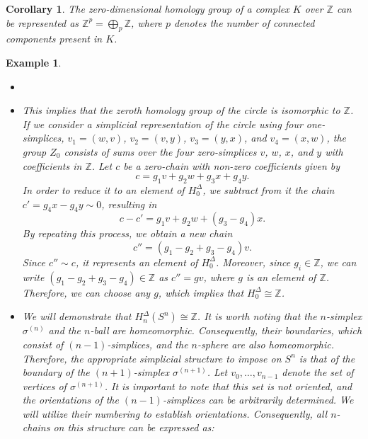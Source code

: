 \documentclass{amsart}
\newtheorem{corollary}[definition]{Corollary}
\newtheorem{example}[definition]{Example}
\begin{document}
\begin{corollary}
\label{directsum0hom}
The zero-dimensional homology group of a complex $K$ over $\mathbb{Z}$ can be represented as $\mathbb{Z}^p = \bigoplus_p \mathbb{Z}$, where $p$ denotes the number of connected components present in $K$.
\end{corollary}

\begin{example}
\begin{itemize}
	\item[]
	\item This implies that the zeroth homology group of the circle is isomorphic to $\mathbb{Z}$. If we consider a simplicial representation of the circle using four one-simplices, $v_1 = (w,v)$, $v_2 = (v,y)$, $v_3 = (y,x)$, and $v_4 = (x,w)$, the group $Z_0$ consists of sums over the four zero-simplices $v$, $w$, $x$, and $y$ with coefficients in $\mathbb{Z}$. Let $c$ be a zero-chain with non-zero coefficients given by
	\begin{equation}
	c = g_1v+g_2w+g_3x+g_4y.
	\end{equation}
	In order to reduce it to an element of $H^\Delta_0$, we subtract from it the chain $c' = g_4x-g_4y \sim 0$, resulting in
	\begin{equation}
	c-c' = g_1v+g_2w +(g_3-g_4)x.
	\end{equation}
	By repeating this process, we obtain a new chain
	\begin{equation}
	c'' = (g_1-g_2+g_3-g_4)v.
	\end{equation}
	Since $c'' \sim c$, it represents an element of $H^\Delta_0$. Moreover, since $g_i \in \mathbb{Z}$, we can write $(g_1-g_2+g_3-g_4) \in \mathbb{Z}$ as $c'' = gv$, where $g$ is an element of $\mathbb{Z}$. Therefore, we can choose any $g$, which implies that $H^\Delta_0 \cong \mathbb{Z}$.
	\item We will demonstrate that $H^\Delta_n(S^n) \cong \mathbb{Z}$. It is worth noting that the $n$-simplex $\sigma^{(n)}$ and the $n$-ball are homeomorphic. Consequently, their boundaries, which consist of $(n-1)$-simplices, and the $n$-sphere are also homeomorphic. Therefore, the appropriate simplicial structure to impose on $S^n$ is that of the boundary of the $(n+1)$-simplex $\sigma^{(n+1)}$. Let ${v_0,\ldots,v_{n-1}}$ denote the set of vertices of $\sigma^{(n+1)}$. It is important to note that this set is not oriented, and the orientations of the $(n-1)$-simplices can be arbitrarily determined. We will utilize their numbering to establish orientations. Consequently, all $n$-chains on this structure can be expressed as:

\end{itemize}
\end{example}
\end{document}
